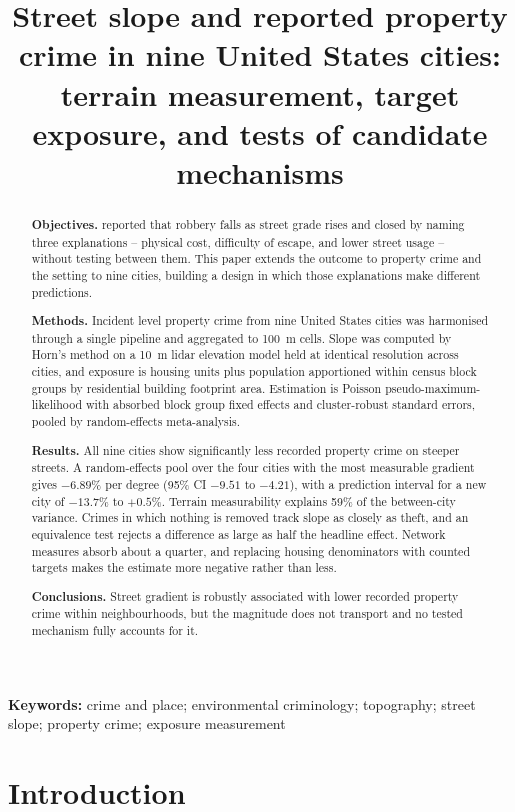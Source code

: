 \documentclass[12pt,letterpaper]{article}
\title{\bfseries Street slope and reported property crime in nine United States cities: terrain measurement, target exposure, and tests of candidate mechanisms}
\author{}
\date{}
\begin{document}
\maketitle
\thispagestyle{fancy}

\begin{abstract}
\noindent
\textbf{Objectives.} \citet{haberman2021} reported that robbery falls as street
grade rises and closed by naming three explanations -- physical cost, difficulty of
escape, and lower street usage -- without testing between them. This paper extends the
outcome to property crime and the setting to nine cities, building a design in which
those explanations make different predictions.

\textbf{Methods.} Incident level property crime from nine United States cities was
harmonised through a single pipeline and aggregated to 100~m cells. Slope was computed
by Horn's method on a 10~m lidar elevation model held at identical resolution across
cities, and exposure is housing units plus population apportioned within census block
groups by residential building footprint area. Estimation is Poisson
pseudo-maximum-likelihood with absorbed block group fixed effects and cluster-robust
standard errors, pooled by random-effects meta-analysis.

\textbf{Results.} All nine cities show significantly less recorded property crime on
steeper streets. A random-effects pool over the four cities with the most measurable
gradient gives $-6.89\%$ per degree (95\% CI $-9.51$ to $-4.21$), with a prediction
interval for a new city of $-13.7\%$ to $+0.5\%$. Terrain measurability explains 59\% of the
between-city variance. Crimes in which nothing is removed track slope as
closely as theft, and an equivalence test rejects a difference as large as half the
headline effect. Network measures absorb about a quarter, and replacing housing
denominators with counted targets makes the estimate more negative rather than less.

\textbf{Conclusions.} Street gradient is robustly associated with lower recorded
property crime within neighbourhoods, but the magnitude does not transport and no
tested mechanism fully accounts for it.
\end{abstract}

\vspace{6pt}
\noindent\textbf{Keywords:} crime and place; environmental criminology;
topography; street slope; property crime; exposure measurement

\linenumbers
\section{Introduction}
\end{document}
